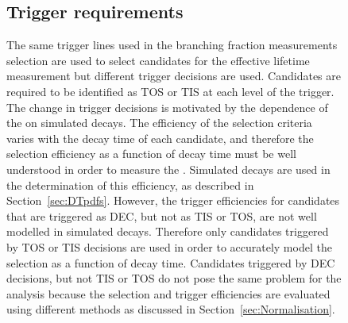 \begin{figure}[tbp]
\subsection{Trigger requirements}
\label{sec:ELtrigger}
The same trigger lines used in the branching fraction measurements selection are used to select candidates for the effective lifetime measurement but different trigger decisions are used. 
Candidates are required to be identified as TOS or TIS at each level of the trigger. The change in trigger decisions is motivated by the dependence of the \elm on simulated decays. The efficiency of the selection criteria varies with the decay time of each candidate, and therefore the selection efficiency as a function of decay time must be well understood in order to measure the \el. Simulated decays are used in the determination of this efficiency, as described in Section~\ref{sec:DTpdfs}. However, the trigger efficiencies for candidates that are triggered as DEC, but not as TIS or TOS, are not well modelled in simulated decays. Therefore only candidates triggered by TOS or TIS decisions are used in order to accurately model the selection as a function of decay time. %
Candidates triggered by DEC decisions, but not TIS or TOS do not pose the same problem for the \BF analysis because the selection and trigger efficiencies are evaluated using different methods as discussed in Section~\ref{sec:Normalisation}.


\end{figure}
